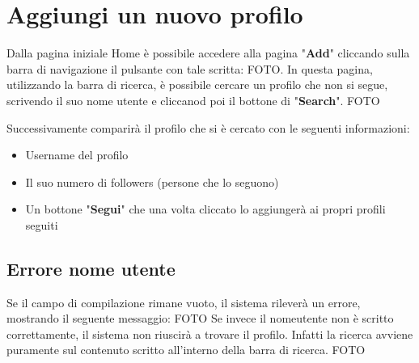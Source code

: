 \section{Aggiungi un nuovo profilo} {
    Dalla pagina iniziale Home è possibile accedere alla pagina "\textbf{Add}" cliccando sulla barra di navigazione il pulsante con tale scritta:
    FOTO.
    \aCapo
    In questa pagina, utilizzando la barra di ricerca, è possibile cercare un profilo che non si segue, scrivendo il suo nome utente e cliccanod poi il bottone di "\textbf{Search}". 
    FOTO 
    
    Successivamente comparirà il profilo che si è cercato con le seguenti informazioni:
    \begin{itemize}
        \item Username del profilo
        \item Il suo numero di followers (persone che lo seguono) 
        \item Un bottone "\textbf{Segui}" che una volta cliccato lo aggiungerà ai propri profili seguiti
    \end{itemize}

    \subsection{Errore nome utente} {
        Se il campo di compilazione rimane vuoto, il sistema rileverà un errore, mostrando il seguente messaggio: FOTO
        Se invece il nomeutente non è scritto correttamente, il sistema non riuscirà a trovare il profilo. Infatti la ricerca avviene puramente sul contenuto scritto all'interno della barra di ricerca.
        FOTO
    }
}
